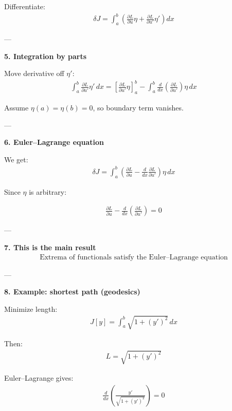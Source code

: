\documentclass[12pt,a4paper]{report}
\begin{document}
\begin{description}
Differentiate:
\begin{align*}
\delta J = \int_a^b \left( \frac{\partial L}{\partial u}\eta + \frac{\partial L}{\partial u'}\eta' \right) dx
\end{align*}

---

\item \textbf{5. Integration by parts}

Move derivative off $\eta'$:
\begin{align*}
\int_a^b \frac{\partial L}{\partial u'} \eta'\,dx = \left[ \frac{\partial L}{\partial u'} \eta \right]_a^b - \int_a^b \frac{d}{dx}\left(\frac{\partial L}{\partial u'}\right)\eta\,dx
\end{align*}

Assume $\eta(a)=\eta(b)=0$, so boundary term vanishes.

---

\item \textbf{6. Euler–Lagrange equation}

We get:
\begin{align*}
\delta J = \int_a^b \left( \frac{\partial L}{\partial u} - \frac{d}{dx}\frac{\partial L}{\partial u'} \right)\eta\,dx
\end{align*}

Since $\eta$ is arbitrary:

\begin{align*}
\boxed{
\frac{\partial L}{\partial u} - \frac{d}{dx}\left(\frac{\partial L}{\partial u'}\right) = 0
}
\end{align*}

---

\item \textbf{7. This is the main result}
\begin{align*}
\boxed{
\text{Extrema of functionals satisfy the Euler–Lagrange equation}
}
\end{align*}

---

\item \textbf{8. Example: shortest path (geodesics)}

Minimize length:
\begin{align*}
J[y] = \int_a^b \sqrt{1 + (y')^2}\,dx
\end{align*}

Then:
\begin{align*}
L = \sqrt{1+(y')^2}
\end{align*}

Euler–Lagrange gives:
\begin{align*}
\frac{d}{dx}\left(\frac{y'}{\sqrt{1+(y')^2}}\right)=0
\end{align*}


\end{description}
\end{document}
